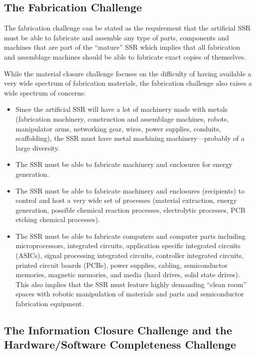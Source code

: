 \subsection[The Fabrication Challenge]{The Fabrication Challenge}

The fabrication challenge can be
stated as the requirement that the artificial SSR must be able to
fabricate and assemble any type of parts, components and machines that
are part of the “mature” SSR which implies that all fabrication and
assemblage machines should be able to fabricate exact copies of
themselves.

While the material closure challenge focuses on the difficulty of having
available a very wide spectrum of fabrication materials, the
fabrication challenge also raises a wide spectrum of concerns:

\begin{itemize}
\item Since the artificial SSR will have a lot of machinery made with
metals (fabrication machinery, construction and assemblage machines,
robots, manipulator arms, networking gear,  wires, power supplies,
conduits, scaffolding), the SSR must have metal machining machinery---probably of a large diversity. 
\item The SSR must be able to fabricate machinery and enclosures for
energy generation.
\item The SSR must be able to fabricate machinery and enclosures
(recipients) to control and host a very wide set of processes
(material extraction, energy generation, possible chemical reaction
processes, electrolytic processes, PCB etching chemical processes).
\item The SSR must be able to fabricate computers and computer parts
including microprocessors, integrated circuits, application specific
integrated circuits (ASICs), signal processing integrated circuits,
controller integrated circuits, printed circuit boards (PCBs), power
supplies, cabling, semiconductor memories, magnetic memories, and media
(hard drives, solid state drives). This also implies that the SSR must
feature highly demanding “clean room” spaces with robotic manipulation
of materials and parts and semiconductor fabrication equipment.
\end{itemize}

\subsection[The Information Closure Challenge and the Hardware/Software
Completeness Challenge]{The Information Closure Challenge and the
Hardware/Software Completeness Challenge}

